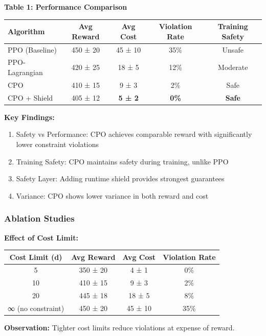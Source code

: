 \documentclass[12pt]{article}
\begin{document}
{{{{\textbf{Table 1: Performance Comparison}

\begin{center}
\begin{tabular}{|l|c|c|c|c|}
\hline
Algorithm & Avg Reward & Avg Cost & Violation Rate & Training Safety \\
\hline
PPO (Baseline) & 450 ± 20 & 45 ± 10 & 35\% & Unsafe \\
PPO-Lagrangian & 420 ± 25 & 18 ± 5 & 12\% & Moderate \\
CPO & 410 ± 15 & 9 ± 3 & 2\% & Safe \\
CPO + Shield & 405 ± 12 & \textbf{5 ± 2} & \textbf{0\%} & \textbf{Safe} \\
\hline
\end{tabular}
\end{center}

\textbf{Key Findings:}
\begin{enumerate}
\item Safety vs Performance: CPO achieves comparable reward with significantly lower constraint violations
\item Training Safety: CPO maintains safety during training, unlike PPO
\item Safety Layer: Adding runtime shield provides strongest guarantees
\item Variance: CPO shows lower variance in both reward and cost
\end{enumerate}

\subsubsection{Ablation Studies}

\textbf{Effect of Cost Limit:}

\begin{center}
\begin{tabular}{|c|c|c|c|}
\hline
Cost Limit (d) & Avg Reward & Avg Cost & Violation Rate \\
\hline
5 & 350 ± 20 & 4 ± 1 & 0\% \\
10 & 410 ± 15 & 9 ± 3 & 2\% \\
20 & 445 ± 18 & 18 ± 5 & 8\% \\
∞ (no constraint) & 450 ± 20 & 45 ± 10 & 35\% \\
\hline
\end{tabular}
\end{center}

\textbf{Observation:} Tighter cost limits reduce violations at expense of reward.

}}}}
\end{document}
